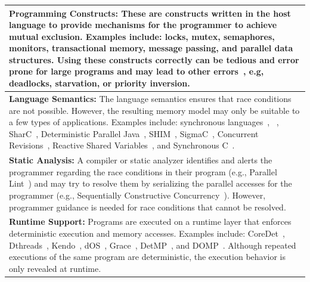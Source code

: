 \begin{table}[t]
	\centering
	\renewcommand{\arraystretch}{1.25}		

	\begin{tabular}{| p{\textwidth} |}
		\hline
		\textbf{Programming Constructs:}
		These are constructs written in the host language to provide mechanisms for the 
		programmer to achieve mutual exclusion. Examples include: locks, mutex, semaphores, monitors, 
		transactional memory, message passing, and parallel data structures. Using these 
		constructs correctly can be tedious and error prone for large programs and may lead to other 
		errors~\cite{multiprocessing_problem_threads,multiprocessing_debugging_concurrency,multiprocessing_debugging_concurrency_study}, 
		e.g, deadlocks, starvation, or priority inversion.									\\ \hline
		
		\textbf{Language Semantics:}
		The language semantics ensures that race conditions are not possible. However, the 
		resulting memory model may only be suitable to a few types of applications. Examples include: synchronous 
		languages~\cite{timed_synchronous_survey}, \pretc{}~\cite{pret_pretc}, SharC~\cite{multiprocessing_sharc}, 
		Deterministic Parallel Java~\cite{multiprocessing_dpj}, SHIM~\cite{multiprocessing_shim_cell}, 
		SigmaC~\cite{multiprocessing_sigmac}, Concurrent Revisions~\cite{BurckhardtL11}, 
		Reactive Shared Variables~\cite{timed_reactivec_shared_variables}, and Synchronous 
		C~\cite{timed_synccharts_c_proposal}. 												\\ \hline
		
		\textbf{Static Analysis:}
		A compiler or static analyzer identifies and alerts the programmer regarding the race 
		conditions in their program (e.g., Parallel Lint~\cite{parallel_lint}) and may try 
		to resolve them by serializing the parallel accesses for the programmer 
		(e.g., Sequentially Constructive Concurrency~\cite{timed_seq_concurrency}). However, 
		programmer guidance is needed for race conditions that cannot be resolved.			\\ \hline
		
		\textbf{Runtime Support:}
		Programs are executed on a runtime layer that enforces deterministic execution 
		and memory accesses. 
		Examples include: CoreDet~\cite{multiprocessing_coredet}, Dthreads~\cite{multiprocessing_dthreads}, 
		Kendo~\cite{multiprocessing_kendo}, dOS~\cite{multiprocessing_dos}, Grace~\cite{multiprocessing_grace}, 
		DetMP~\cite{multiprocessing_detmp}, and DOMP~\cite{multiprocessing_domp}. Although repeated 
		executions of the same program are deterministic, the execution behavior is only 
		revealed at runtime.																\\ \hline
		

\end{tabular}
\end{table}
